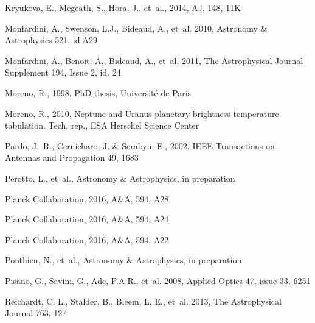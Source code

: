 \begin{thebibliography}{99}
Kryukova, E., Megeath, S.,  Hora, J., {et~al.}, 2014, AJ, 148, 11K
	
Monfardini, A., Swenson, L.J., Bideaud, A., {et~al.} 2010, 
Astronomy \& Astrophysics 521, id.A29

Monfardini, A., Benoit, A., Bideaud, A., {et~al.} 2011, 
The Astrophysical Journal Supplement 194, Issue 2, id. 24

Moreno, R., 1998, 
PhD thesis, Universit\'e de Paris
 
Moreno, R., 2010, 
Neptune and Uranus planetary brightness temperature tabulation. Tech. rep., ESA Herschel Science Center

Pardo, J.~R., Cernicharo, J. \& Serabyn, E., 2002, 
IEEE Transactions on Antennas and Propagation 49, 1683
    
Perotto, L., {et~al.}, 
Astronomy \& Astrophysics, in preparation


Planck Collaboration, 2016, A\&A, 594, A28


Planck Collaboration, 2016, A\&A, 594, A24


Planck Collaboration, 2016, A\&A, 594, A22

Ponthieu, N., {et~al.}, 
Astronomy \& Astrophysics, in preparation

Pisano, G., Savini, G., Ade, P.A.R., {et~al.} 2008, 
Applied Optics 47, issue 33, 6251

Reichardt, C. L., Stalder, B., Bleem, L. E., {et~al.} 2013, 
The Astrophysical Journal 763, 127


\end{thebibliography}
